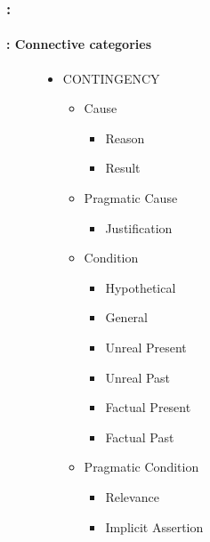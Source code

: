 \documentclass[xcolor=table]{beamer}
\begin{document}
\begin{frame}
	\frametitle{\insertshortsubtitle: \insertsection}
	\framesubtitle{\insertsubsection: Connective categories}
	
	\begin{figure}
		\centering\vspace{-12pt}
		\begin{tcolorbox}[colback=white, colframe=blue, boxrule=1pt, text width=.9\textwidth]
		\begin{minipage}{.3\textwidth}
			\tiny\bfseries\vspace{-6pt}
			\begin{itemize}
				\item CONTINGENCY
				\begin{itemize}\tiny\bfseries
					\item Cause
					\begin{itemize}\tiny\bfseries
						\item Reason
						\item Result
					\end{itemize}
					\item Pragmatic Cause
					\begin{itemize}\tiny\bfseries
						\item Justification
					\end{itemize}
					\item Condition
					\begin{itemize}\tiny\bfseries
						\item Hypothetical
						\item General
						\item Unreal Present
						\item Unreal Past
						\item Factual Present
						\item Factual Past
					\end{itemize}
					\item Pragmatic Condition
					\begin{itemize}\tiny\bfseries
						\item Relevance
						\item Implicit Assertion
					\end{itemize}
				\end{itemize}
			\end{itemize}
		\end{minipage}
		\begin{minipage}{.3\textwidth}
			\tiny\bfseries
			\begin{itemize}\tiny\bfseries

\end{itemize}
\end{minipage}
\end{tcolorbox}
\end{figure}
\end{frame}
\end{document}
